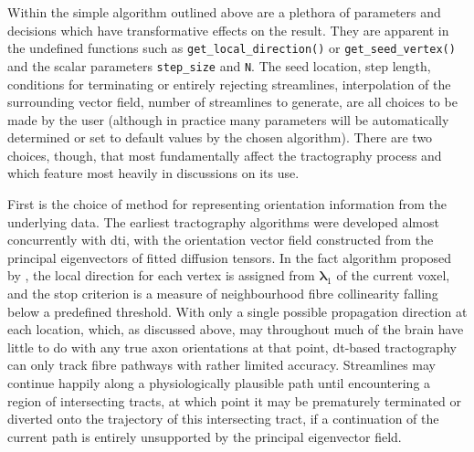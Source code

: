 Within the simple algorithm outlined above are a plethora of parameters and decisions which have transformative effects on the result.
They are apparent in the undefined functions such as \verb|get_local_direction()| or \verb|get_seed_vertex()| and the scalar parameters \verb|step_size| and \verb|N|.
The seed location, step length, conditions for terminating or entirely rejecting streamlines, interpolation of the surrounding vector field, number of streamlines to generate, are all choices to be made by the user (although in practice many parameters will be automatically determined or set to default values by the chosen algorithm).
There are two choices, though, that most fundamentally affect the tractography process and which feature most heavily in discussions on its use.

First is the choice of method for representing orientation information from the underlying data.
The earliest tractography algorithms were developed almost concurrently with \gls{dti}\autocite{Mori1998,Mori1999}, with the orientation vector field constructed from the principal eigenvectors of fitted diffusion tensors.
In the \gls{fact} algorithm proposed by \textcite{Mori1999}, the local direction for each vertex is assigned from $\bm{\lambda}_1$ of the current voxel, and the stop criterion is a measure of neighbourhood fibre collinearity falling below a predefined threshold.
With only a single possible propagation direction at each location, which, as discussed above, may throughout much of the brain have little to do with any true axon orientations at that point, \gls{dt}-based tractography can only track fibre pathways with rather limited accuracy.
Streamlines may continue happily along a physiologically plausible path until encountering a region of intersecting tracts, at which point it may be prematurely terminated or diverted onto the trajectory of this intersecting tract, if a continuation of the current path is entirely unsupported by the principal eigenvector field.

